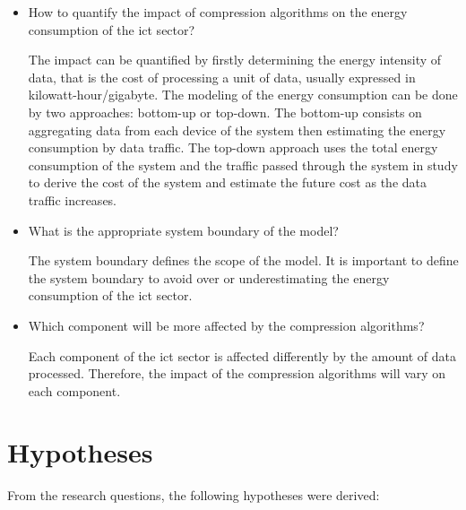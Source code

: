 \begin{itemize}
    \item How to quantify the impact of compression algorithms on the energy consumption of the \ac{ict} sector?

    The impact can be quantified by firstly determining the energy intensity of data, that is the cost of processing a unit of data, usually expressed in \ac{kilowatt-hour}/\ac{gigabyte}.
    The modeling of the energy consumption can be done by two approaches: bottom-up or top-down. 
    The bottom-up consists on aggregating data from each device of the system then estimating the energy consumption by data traffic.
    The top-down approach uses the total energy consumption of the system and the traffic passed through the system in study to derive the cost of the system and estimate the future cost as the data traffic increases.
    
    \item What is the appropriate system boundary of the model?
    
    The system boundary defines the scope of the model. It is important to define the system boundary to avoid over or underestimating the energy consumption of the \ac{ict} sector.

    \item Which component will be more affected by the compression algorithms?

    Each component of the \ac{ict} sector is affected differently by the amount of data processed. Therefore, the impact of the compression algorithms will vary on each component.
\end{itemize}

\section{Hypotheses}
\label{section:hypotheses}

From the research questions, the following hypotheses were derived:

